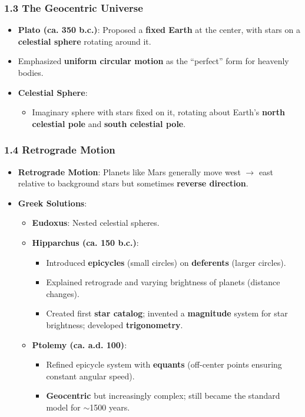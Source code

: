 \subsubsection*{1.3 The Geocentric Universe}
\begin{itemize}
    \item \textbf{Plato (ca. 350 b.c.)}: Proposed a \textbf{fixed Earth} at the center, with stars on a \textbf{celestial sphere} rotating around it.
    \item Emphasized \textbf{uniform circular motion} as the ``perfect'' form for heavenly bodies.
    \item \textbf{Celestial Sphere}:  
    \begin{itemize}
        \item Imaginary sphere with stars fixed on it, rotating about Earth’s \textbf{north celestial pole} and \textbf{south celestial pole}.
    \end{itemize}
\end{itemize}

\subsubsection*{1.4 Retrograde Motion}
\begin{itemize}
    \item \textbf{Retrograde Motion}: Planets like Mars generally move west $\rightarrow$ east relative to background stars but sometimes \textbf{reverse direction}.
    \item \textbf{Greek Solutions}:
    \begin{itemize}
        \item \textbf{Eudoxus}: Nested celestial spheres.
        \item \textbf{Hipparchus (ca. 150 b.c.)}:
        \begin{itemize}
            \item Introduced \textbf{epicycles} (small circles) on \textbf{deferents} (larger circles).
            \item Explained retrograde and varying brightness of planets (distance changes).
            \item Created first \textbf{star catalog}; invented a \textbf{magnitude} system for star brightness; developed \textbf{trigonometry}.
        \end{itemize}
        \item \textbf{Ptolemy (ca. a.d. 100)}:
        \begin{itemize}
            \item Refined epicycle system with \textbf{equants} (off-center points ensuring constant angular speed).
            \item \textbf{Geocentric} but increasingly complex; still became the standard model for $\sim$1500 years.
        \end{itemize}
    \end{itemize}
\end{itemize}

